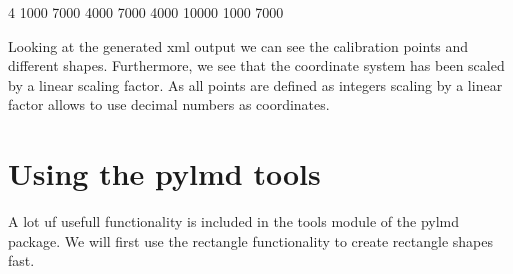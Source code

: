 \documentclass[letterpaper,10pt,english,openany,oneside]{sphinxmanual}
\begin{document}
\begin{sphinxVerbatim}[commandchars=\\\{\}]
    4
    1000
    7000
    4000
    7000
    4000
    10000
    1000
    7000
\end{sphinxVerbatim}

\sphinxAtStartPar
Looking at the generated xml output we can see the calibration points and different shapes. Furthermore, we see that the coordinate system has been scaled by a linear scaling factor. As all points are defined as integers scaling by a linear factor allows to use decimal numbers as coordinates.


\section{Using the py\sphinxhyphen{}lmd tools}
\label{\detokenize{pages/quickstart:using-the-py-lmd-tools}}
\sphinxAtStartPar
A lot uf usefull functionality is included in the tools module of the py\sphinxhyphen{}lmd package. We will first use the rectangle functionality to create rectangle shapes fast.

\begin{sphinxVerbatim}[commandchars=\\\{\}]
   
    
   

  \PYG{p}{[}\PYG{p}{[} \PYG{p}{]} \PYG{p}{[} \PYG{p}{]} \PYG{p}{[} \PYG{p}{]}\PYG{p}{]}
    
\end{sphinxVerbatim}
\end{document}
